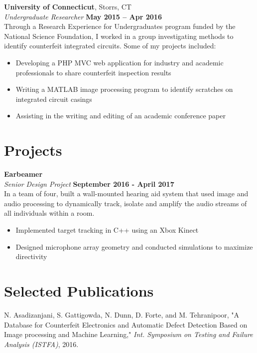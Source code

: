\documentclass[margin,line]{resume}
\begin{document}
\begin{resume}
    \textbf{University of Connecticut}, Storrs, CT \vspace{2mm}\\\vspace{1mm}%
    \textsl{Undergraduate Researcher} \hfill \textbf{May 2015 -- Apr 2016}\\
    Through a Research Experience for Undergraduates program funded by the National Science Foundation, I worked in a group investigating methods to identify counterfeit integrated circuits. Some of my projects included:
    \begin{itemize}
     \item Developing a PHP MVC web application for industry and academic professionals to share counterfeit inspection results
     \item Writing a MATLAB image processing program  to identify scratches on integrated circuit casings
     \item Assisting in the writing and editing of an academic conference paper
    \end{itemize}


\section{\mysidestyle Projects}

    \textbf{Earbeamer}\vspace{2mm}\\\vspace{1mm}%
    \textsl{Senior Design Project} \hfill \textbf{September 2016 - April 2017}\\
    In a team of four, built a wall-mounted hearing aid system that used image and audio processing to dynamically track, isolate and amplify the audio streams of all individuals within a room. \begin{itemize}
        \item Implemented target tracking in C++ using an Xbox Kinect
        \item Designed microphone array geometry and conducted simulations to maximize directivity
    \end{itemize}

   \section{\mysidestyle Selected Publications}
   N. Asadizanjani, S. Gattigowda, N. Dunn, D. Forte, and M. Tehranipoor, "A Database for Counterfeit Electronics and Automatic Defect Detection Based on Image processing and Machine Learning," \textsl{Int. Symposium on Testing and Failure Analysis (ISTFA)}, 2016.
\vspace{-2mm}


\end{resume}
\end{document}
